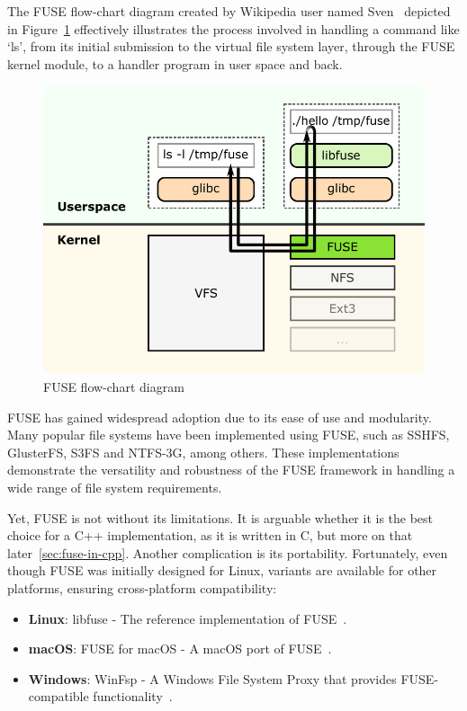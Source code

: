 The FUSE flow-chart diagram created by Wikipedia user named Sven~\cite{fuse-diagram} depicted in Figure~\ref{fig:fuse-diagram} effectively illustrates the process involved in handling a command like `ls', from its initial submission to the virtual file system layer, through the FUSE kernel module, to a handler program in user space and back.

\begin{figure}[ht]
    \centering
    \includegraphics[width=0.8\linewidth]{img/fuse_diagram}
    \caption{FUSE flow-chart diagram}\label{fig:fuse-diagram}
\end{figure}

FUSE has gained widespread adoption due to its ease of use and modularity.
Many popular file systems have been implemented using FUSE, such as SSHFS, GlusterFS, S3FS and NTFS-3G, among others.
These implementations demonstrate the versatility and robustness of the FUSE framework in handling a wide range of file system requirements.

Yet, FUSE is not without its limitations.
It is arguable whether it is the best choice for a C++ implementation, as it is written in C, but more on that later~\ref{sec:fuse-in-cpp}.
Another complication is its portability.
Fortunately, even though FUSE was initially designed for Linux, variants are available for other platforms, ensuring cross-platform compatibility:

\begin{itemize}
    \item \textbf{Linux}: libfuse - The reference implementation of FUSE~\cite{libfuse}.
    \item \textbf{macOS}: FUSE for macOS - A macOS port of FUSE~\cite{osxfuse}.
    \item \textbf{Windows}: WinFsp - A Windows File System Proxy that provides FUSE-compatible functionality~\cite{winfsp}.
\end{itemize}

